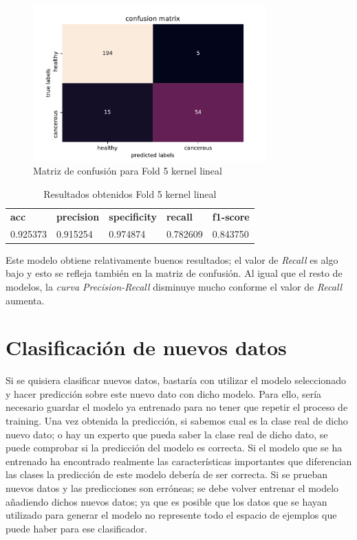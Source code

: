 \begin{figure}[H]
	\centering
	\includegraphics[width=90mm]{imagenes/confusion_mat5_gpflow_linear}
	\caption{Matriz de confusión para Fold 5 kernel lineal}
	\label{fig:conf5_lin}
\end{figure}

\begin{table}[H]
	\centering
	\begin{tabular}{lllll}
		\textbf{acc} & \textbf{precision} & \textbf{specificity} & \textbf{recall} & \textbf{f1-score} \\
		0.925373     & 0.915254           & 0.974874             & 0.782609        & 0.843750        
	\end{tabular}
	\caption{Resultados obtenidos Fold 5 kernel lineal}
	\label{table:10}
\end{table}

Este modelo obtiene relativamente buenos resultados; el valor de \textit{Recall} es algo bajo y esto se refleja también en la matriz de confusión. Al igual que el resto de modelos, la \textit{curva Precision-Recall} disminuye mucho conforme el valor de \textit{Recall} aumenta.

\section{Clasificación de nuevos datos}
Si se quisiera clasificar nuevos datos, bastaría con utilizar el modelo seleccionado y hacer predicción sobre este nuevo dato con dicho modelo. Para ello, sería necesario guardar el modelo ya entrenado para no tener que repetir el proceso de training. Una vez obtenida la predicción, si sabemos cual es la clase real de dicho nuevo dato; o hay un experto que pueda saber la clase real de dicho dato, se puede comprobar si la predicción del modelo es correcta. Si el modelo que se ha entrenado ha encontrado realmente las características importantes que diferencian las clases la predicción de este modelo debería de ser correcta. Si se prueban nuevos datos y las predicciones son erróneas; se debe volver entrenar el modelo añadiendo dichos nuevos datos; ya que es posible que los datos que se hayan utilizado para generar el modelo no represente todo el espacio de ejemplos que puede haber para ese clasificador.\newline

